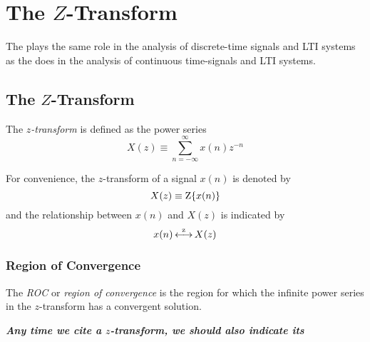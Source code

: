 \section{The \texorpdfstring{$Z$-Transform}{Z-Transform}}\label{sec:Z-Transform}
The  plays the same role in the analysis of discrete-time signals and LTI systems as the  does in the analysis of continuous time-signals and LTI systems.

\subsection{The \texorpdfstring{$Z$-Transform}{Z-Transform}}\label{subsec:Z-Transform}
\begin{definition}[$Z$-Transform]\label{def:Z-Transform}
  The \emph{$z$-transform} is defined as the power series
  \begin{equation}\label{eq:Z-Transform}
    X(z) \equiv \sum_{n=-\infty}^{\infty} x(n)z^{-n}
  \end{equation}

  \begin{remark}
    For convenience, the $z$-transform of a signal $x(n)$ is denoted by
    \begin{equation}\label{eq:Z-Transform Representation}
      X(z) \equiv \operatorname{Z} \lbrace x(n) \rbrace
    \end{equation}
    and the relationship between $x(n)$ and $X(z)$ is indicated by
    \begin{equation}\label{eq:Z-Transform Relationship}
      x(n) \operatorname{\overset{z}{\longleftrightarrow}} X(z)
    \end{equation}
  \end{remark}
\end{definition}

\subsubsection{Region of Convergence}\label{subsubsec:ROC}
\begin{definition}[ROC]\label{def:ROC}
  The \emph{ROC} or \emph{region of convergence} is the region for which the infinite power series in the $z$-transform has a convergent solution.
  \begin{remark}
    \textbf{\emph{Any time we cite a $z$-transform, we should also indicate its }}
  \end{remark}
\end{definition}

